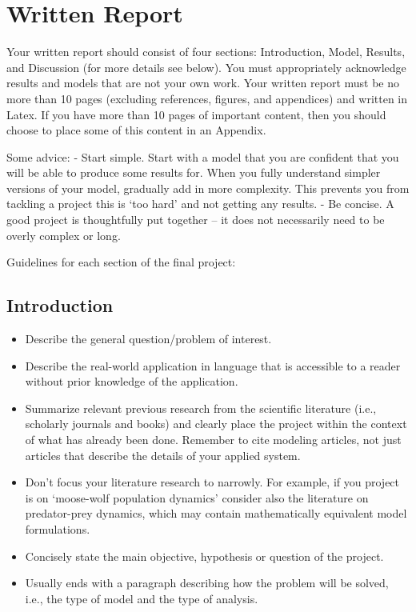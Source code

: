 \documentclass[]{book}
\providecommand{\tightlist}{%
  \setlength{\itemsep}{0pt}\setlength{\parskip}{0pt}}
\begin{document}
\section{Written Report}\label{written-report}

Your written report should consist of four sections: Introduction,
Model, Results, and Discussion (for more details see below). You must
appropriately acknowledge results and models that are not your own work.
Your written report must be no more than 10 pages (excluding references,
figures, and appendices) and written in Latex. If you have more than 10
pages of important content, then you should choose to place some of this
content in an Appendix.

Some advice: - Start simple. Start with a model that you are confident
that you will be able to produce some results for. When you fully
understand simpler versions of your model, gradually add in more
complexity. This prevents you from tackling a project this is `too hard'
and not getting any results. - Be concise. A good project is
thoughtfully put together -- it does not necessarily need to be overly
complex or long.

Guidelines for each section of the final project:

\subsection{Introduction}\label{introduction}

\begin{itemize}
\tightlist
\item
  Describe the general question/problem of interest.
\item
  Describe the real-world application in language that is accessible to
  a reader without prior knowledge of the application.
\item
  Summarize relevant previous research from the scientific literature
  (i.e., scholarly journals and books) and clearly place the project
  within the context of what has already been done. Remember to cite
  modeling articles, not just articles that describe the details of your
  applied system.
\item
  Don't focus your literature research to narrowly. For example, if you
  project is on `moose-wolf population dynamics' consider also the
  literature on predator-prey dynamics, which may contain mathematically
  equivalent model formulations.
\item
  Concisely state the main objective, hypothesis or question of the
  project.
\item
  Usually ends with a paragraph describing how the problem will be
  solved, i.e., the type of model and the type of analysis.
\end{itemize}
\end{document}

